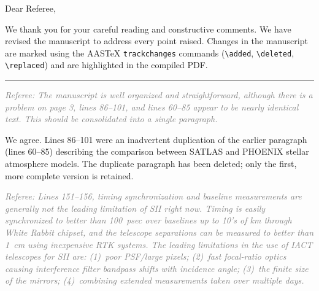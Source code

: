 \documentclass[12pt]{article}
\newcommand{\referee}[1]{\medskip\noindent\textit{\textcolor{gray}{Referee: #1}}\medskip}
\newcommand{\response}[1]{\noindent #1\medskip}
\begin{document}
\noindent Dear Referee,

\medskip

We thank you for your careful reading and constructive comments. We have revised the
manuscript to address every point raised. Changes in the manuscript are marked using the
AASTeX \texttt{trackchanges} commands (\verb|\added|, \verb|\deleted|, \verb|\replaced|)
and are highlighted in the compiled PDF.

\bigskip
\hrule
\bigskip

\referee{The manuscript is well organized and straightforward, although there is
a problem on page 3, lines 86--101, and lines 60--85 appear to be nearly identical
text. This should be consolidated into a single paragraph.}

\response{We agree. Lines 86--101 were an inadvertent duplication of the earlier
paragraph (lines 60--85) describing the comparison between SATLAS and PHOENIX stellar
atmosphere models. The duplicate paragraph has been deleted; only the first, more
complete version is retained.}

\bigskip
\referee{Lines 151--156, timing synchronization and baseline measurements are generally
not the leading limitation of SII right now. Timing is easily synchronized to better
than 100~psec over baselines up to 10's of km through White Rabbit chipset, and the
telescope separations can be measured to better than 1~cm using inexpensive RTK systems.
The leading limitations in the use of IACT telescopes for SII are: (1)~poor PSF/large
pixels; (2)~fast focal-ratio optics causing interference filter bandpass shifts with
incidence angle; (3)~the finite size of the mirrors; (4)~combining extended measurements
taken over multiple days.}
\end{document}
